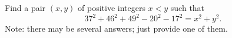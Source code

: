 Find a pair $(x,y)$ of positive integers $x<y$ such that
\[
	37^2+46^2+49^2-20^2-17^2=x^2+y^2.
\]
Note: there may be several answers; just provide one of them.